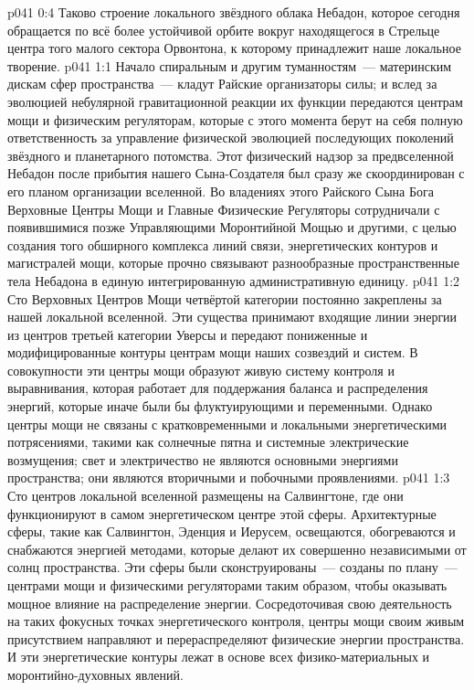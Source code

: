 \vs p041 0:4 Таково строение локального звёздного облака Небадон, которое сегодня обращается по всё более устойчивой орбите вокруг находящегося в Стрельце центра того малого сектора Орвонтона, к которому принадлежит наше локальное творение.
\vs p041 1:1 Начало спиральным и другим туманностям~--- материнским дискам сфер пространства~--- кладут Райские организаторы силы; и вслед за эволюцией небулярной гравитационной реакции их функции передаются центрам мощи и физическим регуляторам, которые с этого момента берут на себя полную ответственность за управление физической эволюцией последующих поколений звёздного и планетарного потомства. Этот физический надзор за предвселенной Небадон после прибытия нашего Сына\hyp{}Создателя был сразу же скоординирован с его планом организации вселенной. Во владениях этого Райского Сына Бога Верховные Центры Мощи и Главные Физические Регуляторы сотрудничали с появившимися позже Управляющими Моронтийной Мощью и другими, с целью создания того обширного комплекса линий связи, энергетических контуров и магистралей мощи, которые прочно связывают разнообразные пространственные тела Небадона в единую интегрированную административную единицу.
\vs p041 1:2 Сто Верховных Центров Мощи четвёртой категории постоянно закреплены за нашей локальной вселенной. Эти существа принимают входящие линии энергии из центров третьей категории Уверсы и передают пониженные и модифицированные контуры центрам мощи наших созвездий и систем. В совокупности эти центры мощи образуют живую систему контроля и выравнивания, которая работает для поддержания баланса и распределения энергий, которые иначе были бы флуктуирующими и переменными. Однако центры мощи не связаны с кратковременными и локальными энергетическими потрясениями, такими как солнечные пятна и системные электрические возмущения; свет и электричество не являются основными энергиями пространства; они являются вторичными и побочными проявлениями.
\vs p041 1:3 Сто центров локальной вселенной размещены на Салвингтоне, где они функционируют в самом энергетическом центре этой сферы. Архитектурные сферы, такие как Салвингтон, Эденция и Иерусем, освещаются, обогреваются и снабжаются энергией методами, которые делают их совершенно независимыми от солнц пространства. Эти сферы были сконструированы~--- созданы по плану~--- центрами мощи и физическими регуляторами таким образом, чтобы оказывать мощное влияние на распределение энергии. Сосредоточивая свою деятельность на таких фокусных точках энергетического контроля, центры мощи своим живым присутствием направляют и перераспределяют физические энергии пространства. И эти энергетические контуры лежат в основе всех физико\hyp{}материальных и моронтийно\hyp{}духовных явлений.
